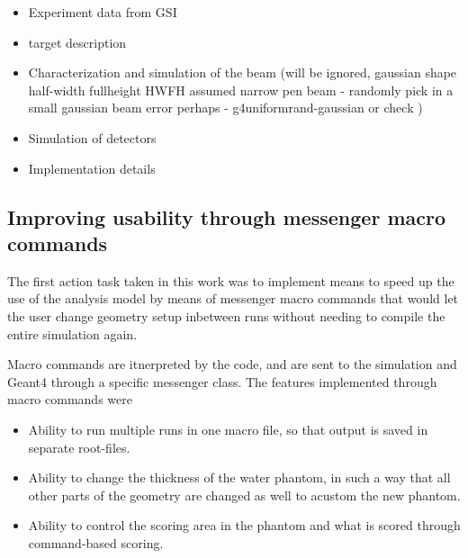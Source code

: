 

\begin{itemize}
\item Experiment data from GSI
\item target description
\item Characterization and simulation of the beam (will be ignored, gaussian shape half-width fullheight HWFH assumed narrow pen beam - randomly pick in a small gaussian beam error perhaps - g4uniformrand-gaussian or check )
\item Simulation of detectors
\item Implementation details
\end{itemize}

\subsection{Improving usability through messenger macro commands}
The first action task taken in this work was to implement means to speed up the use of the analysis model by means of messenger macro commands that would let the user change geometry setup inbetween runs without needing to compile the entire simulation again.

Macro commands are itnerpreted by the code, and are sent to the simulation and Geant4 through a specific messenger class. The features implemented through macro commands were
\begin{itemize}
 \item Ability to run multiple runs in one macro file, so that output is saved in separate root-files.
\item Ability to change the thickness of the water phantom, in such a way that all other parts of the geometry are changed as well to acustom the new phantom.
\item Ability to control the scoring area in the phantom and what is scored through command-based scoring.
\end{itemize}


